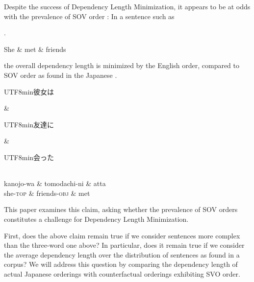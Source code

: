 \documentclass[11pt,a4paper]{article}
\newcommand{\japanese}[1]{\begin{CJK}{UTF8}{min}#1\end{CJK}}
\begin{document}
Despite the success of Dependency Length Minimization, it appears to be at odds with the prevalence of SOV order \citep{ferrer-i-cancho-placement-2017}: In a sentence such as

\ex.
\begin{dependency}[theme = simple]
   \begin{deptext}[column sep=1em]
          She \& met \& friends  \\
   \end{deptext}
\end{dependency}

the overall dependency length is minimized by the English order, compared to SOV order as found in the Japanese
\ex.
\begin{dependency}[theme = simple]
   \begin{deptext}[column sep=1em]
          \japanese{彼女は} \& \japanese{友達に} \& \japanese{会った}  \\
          kanojo-wa \& tomodachi-ni \& atta \\ 
          she-\textsc{top} \& friends-\textsc{obj} \& met \\
   \end{deptext}
\end{dependency}


This paper examines this claim,  %
asking whether the prevalence of SOV orders constitutes a challenge for Dependency Length Minimization.

First, does the above claim remain true if we consider sentences more complex than the three-word one above? %
In particular, does it remain true if we consider the average dependency length over the distribution of sentences as found in a corpus?
We will address this question by comparing the dependency length of actual Japanese orderings with counterfactual orderings exhibiting SVO order.
\end{document}
